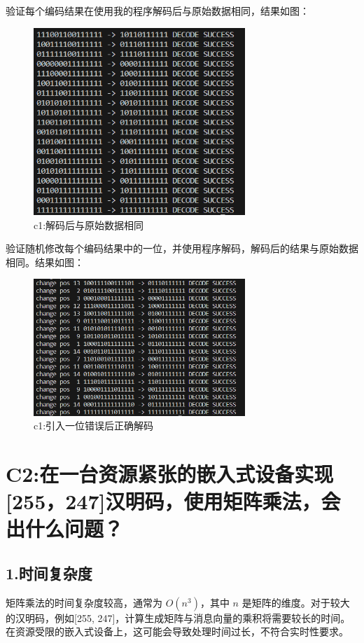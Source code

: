 \documentclass[12pt, a4paper]{ctexart}
\begin{document}
    验证每个编码结果在使用我的程序解码后与原始数据相同，结果如图：
    \begin{figure}[H]
        \centering
        \includegraphics[width=8cm]{./pic/1-2.png}		
        \caption{c1:解码后与原始数据相同}
    \end{figure}

    验证随机修改每个编码结果中的一位，并使用程序解码，解码后的结果与原始数据相同。结果如图：
    \begin{figure}[H]
        \centering
        \includegraphics[width=8cm]{./pic/1-3.png}		
        \caption{c1:引入一位错误后正确解码}
    \end{figure}
    
    
\section*{C2:在一台资源紧张的嵌入式设备实现[255，247]汉明码，使用矩阵乘法，会出什么问题？}

\subsection*{1.时间复杂度}

矩阵乘法的时间复杂度较高，通常为 $O(n^3)$，其中 $n$ 是矩阵的维度。对于较大的汉明码，例如[255, 247]，计算生成矩阵与消息向量的乘积将需要较长的时间。在资源受限的嵌入式设备上，这可能会导致处理时间过长，不符合实时性要求。
\end{document}
